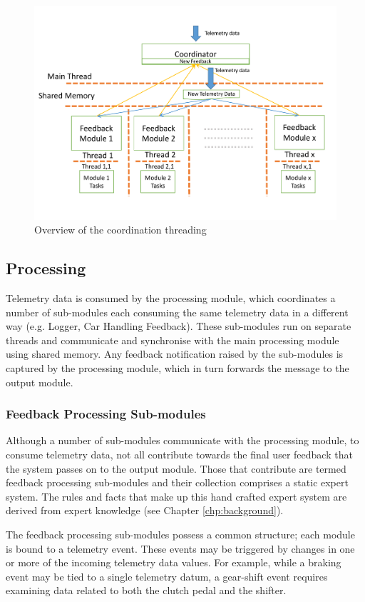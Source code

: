 \begin{figure}[!htb]
	\centering
	\includegraphics[width=\textwidth]{diagrams/multithreading.pdf}
	\caption{Overview of the coordination threading}
	\label{fig:multithreading}
\end{figure}

\subsection{Processing}
Telemetry data is consumed by the processing module, which coordinates a number of sub-modules each consuming the same telemetry data in a different way (e.g. Logger, Car Handling Feedback). These sub-modules run on separate threads and communicate and synchronise with the main processing module using shared memory. Any feedback notification raised by the sub-modules is captured by the processing module, which in turn forwards the message to the output module.

\subsubsection{Feedback Processing Sub-modules}
Although a number of sub-modules communicate with the processing module, to consume telemetry data, not all contribute towards the final user feedback that the system passes on to the output module. Those that contribute are termed feedback processing sub-modules and their collection comprises a static expert system. The rules and facts that make up this hand crafted expert system are derived from expert knowledge (see Chapter \ref{chp:background}).

The feedback processing sub-modules possess a common structure; each module is bound to a telemetry event. These events may be triggered by changes in one or more of the incoming telemetry data values. For example, while a braking event may be tied to a single telemetry datum, a gear-shift event requires examining data related to both the clutch pedal and the shifter. 

